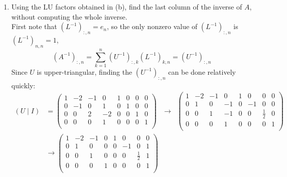 \documentclass[11pt]{article}
\newcommand{\n}{\vspace{0.3cm}}
\begin{document}
\begin{enumerate}
\begin{enumerate}
		      \item Using the LU factors obtained in (b), find the last column of the inverse of \(A\), without computing the whole inverse. \n\\
		            First note that \((L^{-1})_{:,n} = e_n\), so the only nonzero value of \((L^{-1})_{:,n}\) is \((L^{-1})_{n,n} = 1\),
		            \[(A^{-1})_{:,n} = \sum_{k=1}^n (U^{-1})_{:,k}(L^{-1})_{k,n} = (U^{-1})_{:,n}\]
		            Since \(U\) is upper-triangular, finding the \((U^{-1})_{:,n}\) can be done relatively quickly:
		            \begin{align*}
			            (U \mid I) & = \left(\begin{array}{rrrr|rrrr}
					                                 1 & -2 & -1 & 0  & 1 & 0 & 0 & 0 \\
					                                 0 & -1 & 0  & 1  & 0 & 1 & 0 & 0 \\
					                                 0 & 0  & 2  & -2 & 0 & 0 & 1 & 0 \\
					                                 0 & 0  & 0  & 1  & 0 & 0 & 0 & 1 \\
				                                 \end{array}\right)
			                       & \to                                 &
			            \left(\begin{array}{rrrr|rrrr}
					                  1 & -2 & -1 & 0  & 1 & 0  & 0       & 0 \\
					                  0 & 1  & 0  & -1 & 0 & -1 & 0       & 0 \\
					                  0 & 0  & 1  & -1 & 0 & 0  & \frac12 & 0 \\
					                  0 & 0  & 0  & 1  & 0 & 0  & 0       & 1 \\
				                  \end{array}\right)         \\
			                       & \to
			            \left(\begin{array}{rrrr|rrrr}
					                  1 & -2 & -1 & 0 & 1 & 0  & 0       & 0 \\
					                  0 & 1  & 0  & 0 & 0 & -1 & 0       & 1 \\
					                  0 & 0  & 1  & 0 & 0 & 0  & \frac12 & 1 \\
					                  0 & 0  & 0  & 1 & 0 & 0  & 0       & 1 \\
				                  \end{array}\right)

\end{align*}
\end{enumerate}
\end{enumerate}
\end{document}
